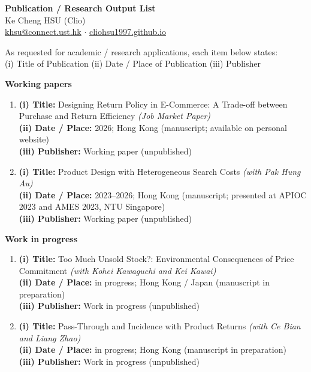 \documentclass[11pt]{article}
\begin{document}
\begin{center}
{\Large\bfseries Publication / Research Output List}\\[0.35em]
{\large Ke Cheng HSU (Clio)}\\[0.2em]
\href{mailto:khsu@connect.ust.hk}{khsu@connect.ust.hk} $\cdot$
\href{https://cliohsu1997.github.io/}{cliohsu1997.github.io}
\end{center}

\vspace{0.55em}

\noindent
As requested for academic / research applications, each item below states:\\[0.15em]
(i) Title of Publication\quad
(ii) Date / Place of Publication\quad
(iii) Publisher

\vspace{0.45em}
{\large\bfseries Working papers}

\begin{enumerate}[leftmargin=*, itemsep=0.7em]
\item
\textbf{(i) Title:} Designing Return Policy in E-Commerce: A Trade-off between Purchase and Return Efficiency \textit{(Job Market Paper)}\\
\textbf{(ii) Date / Place:} 2026; Hong Kong (manuscript; available on personal website)\\
\textbf{(iii) Publisher:} Working paper (unpublished)

\item
\textbf{(i) Title:} Product Design with Heterogeneous Search Costs \textit{(with Pak Hung Au)}\\
\textbf{(ii) Date / Place:} 2023--2026; Hong Kong (manuscript; presented at APIOC 2023 and AMES 2023, NTU Singapore)\\
\textbf{(iii) Publisher:} Working paper (unpublished)
\end{enumerate}

\vspace{0.35em}
{\large\bfseries Work in progress}

\begin{enumerate}[leftmargin=*, itemsep=0.7em, resume]
\item
\textbf{(i) Title:} Too Much Unsold Stock?: Environmental Consequences of Price Commitment \textit{(with Kohei Kawaguchi and Kei Kawai)}\\
\textbf{(ii) Date / Place:} in progress; Hong Kong / Japan (manuscript in preparation)\\
\textbf{(iii) Publisher:} Work in progress (unpublished)

\item
\textbf{(i) Title:} Pass-Through and Incidence with Product Returns \textit{(with Ce Bian and Liang Zhao)}\\
\textbf{(ii) Date / Place:} in progress; Hong Kong (manuscript in preparation)\\
\textbf{(iii) Publisher:} Work in progress (unpublished)
\end{enumerate}
\end{document}
